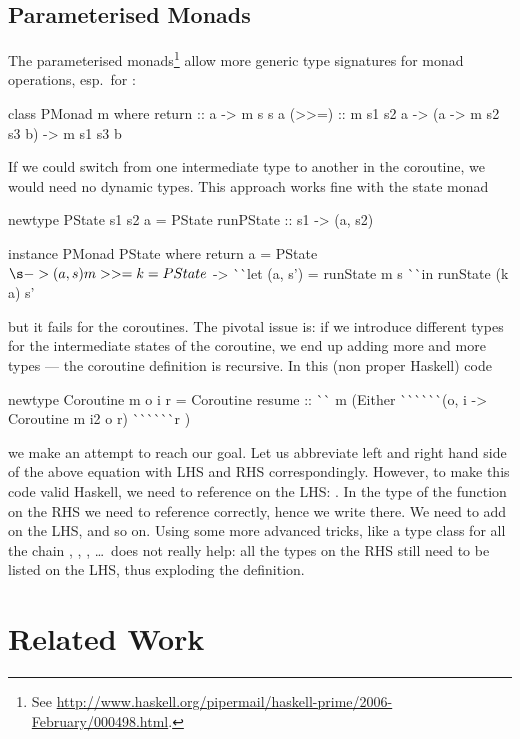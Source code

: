 \subsection{Parameterised Monads}
The parameterised monads\footnote{See \url{http://www.haskell.org/pipermail/haskell-prime/2006-February/000498.html}.}  allow more generic type signatures for monad operations, esp.\ for \hs{>>=}\xspace\nolinebreak[4] \cite{monad-parametrisable}:
\begin{code}
class PMonad m where
  return :: a -> m s s a
  (>>=)  :: m s1 s2 a -> (a -> m s2 s3 b) -> m s1 s3 b
\end{code}
If we could switch from one  intermediate type to another in the coroutine, we would need no dynamic types.
This approach works fine with the state monad
\begin{code}
newtype PState s1 s2 a
  = PState { runPState :: s1 -> (a, s2) }

instance PMonad PState where
  return a  = PState $ \s -> (a, s)
  m >>= k   = PState $ \s ->
                ^^ ^^ let (a, s') = runState m s
                ^^ ^^ in  runState (k a) s'
\end{code}
but it fails for the coroutines.
The pivotal issue is: if we introduce different types for the intermediate states of the coroutine, we end up adding more and more types --- the coroutine definition is recursive.
In this (non proper Haskell) code
\begin{code}
newtype Coroutine m o i r
  =  Coroutine { resume ::
       ^^ ^^  m (Either
       ^^ ^^ ^^ ^^ ^^ ^^ (o, i -> Coroutine m i2 o r)
       ^^ ^^ ^^ ^^ ^^ ^^ r 
       )}
\end{code}
we make an attempt to reach our goal.
Let us abbreviate left and right hand side of the above equation with LHS and RHS correspondingly.
However, to make this code valid Haskell, we need to reference  on the LHS: .
In the type of the  function on the RHS we need to reference  correctly, hence we write  there.
We need to add  on the LHS, and so on.
Using some more advanced tricks, like a type class for all the chain , , , \dots\ does not really help: all the types on the RHS still need to be listed on the LHS, thus exploding the definition.

\section{Related Work}
\label{sec:related-work}

